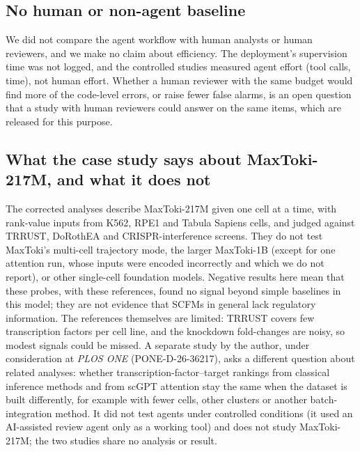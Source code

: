 \documentclass[10pt,letterpaper]{article}
\newcommand{\scfm}{SCFM\xspace}
\begin{document}
\subsection*{No human or non-agent baseline}
We did not compare the agent workflow with human analysts or human
reviewers, and we make no claim about efficiency. The deployment's
supervision time was not logged, and the controlled studies measured
agent effort (tool calls, time), not human effort. Whether a human
reviewer with the same budget would find more of the code-level errors,
or raise fewer false alarms, is an open question that a study with human
reviewers could answer on the same items, which are released for this
purpose.

\subsection*{What the case study says about MaxToki-217M, and what it does not}
The corrected analyses describe MaxToki-217M given one cell at a time,
with rank-value inputs from K562, RPE1 and Tabula Sapiens cells, and
judged against TRRUST, DoRothEA and CRISPR-interference screens. They do
not test MaxToki's multi-cell trajectory mode, the larger MaxToki-1B
(except for one attention run, whose inputs were encoded incorrectly and
which we do not report), or other single-cell foundation models. Negative
results here mean that these probes, with these references, found no
signal beyond simple baselines in this model; they are not evidence that
\scfm{}s in general lack regulatory information. The references themselves
are limited: TRRUST covers few transcription factors per cell line, and
the knockdown fold-changes are noisy, so modest signals could be missed.
A separate study by the author, under consideration at \textit{PLOS ONE}
(PONE-D-26-36217), asks a different question about related analyses:
whether transcription-factor--target rankings from classical inference
methods and from scGPT attention stay the same when the dataset is built
differently, for example with fewer cells, other clusters or another
batch-integration method. It did not test agents under controlled
conditions (it used an AI-assisted review agent only as a working tool)
and does not study MaxToki-217M; the two studies share no analysis or
result.
\end{document}

